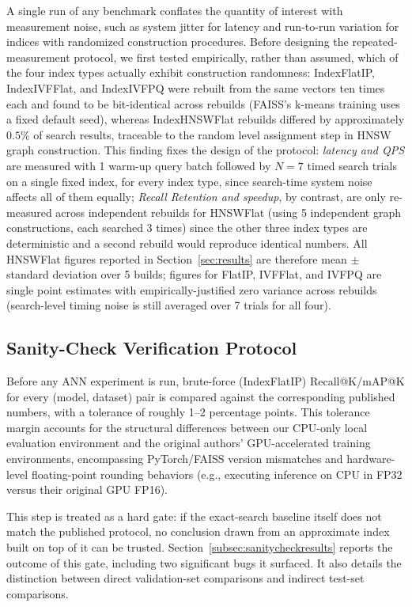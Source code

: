 \documentclass[conference]{IEEEtran}
\begin{document}
A single run of any benchmark conflates the quantity of interest with measurement noise, such as system jitter for latency and run-to-run variation for indices with randomized construction procedures. Before designing the repeated-measurement protocol, we first tested empirically, rather than assumed, which of the four index types actually exhibit construction randomness: IndexFlatIP, IndexIVFFlat, and IndexIVFPQ were rebuilt from the same vectors ten times each and found to be bit-identical across rebuilds (FAISS's k-means training uses a fixed default seed), whereas IndexHNSWFlat rebuilds differed by approximately $0.5\%$ of search results, traceable to the random level assignment step in HNSW graph construction. This finding fixes the design of the protocol: \emph{latency and QPS} are measured with 1 warm-up query batch followed by $N=7$ timed search trials on a single fixed index, for every index type, since search-time system noise affects all of them equally; \emph{Recall Retention and speedup}, by contrast, are only re-measured across independent rebuilds for HNSWFlat (using 5 independent graph constructions, each searched 3 times) since the other three index types are deterministic and a second rebuild would reproduce identical numbers. All HNSWFlat figures reported in Section~\ref{sec:results} are therefore mean $\pm$ standard deviation over 5 builds; figures for FlatIP, IVFFlat, and IVFPQ are single point estimates with empirically-justified zero variance across rebuilds (search-level timing noise is still averaged over 7 trials for all four).

\subsection{Sanity-Check Verification Protocol}
\label{subsec:sanitycheck}

Before any ANN experiment is run, brute-force (IndexFlatIP) Recall@K/mAP@K for every (model, dataset) pair is compared against the corresponding published numbers, with a tolerance of roughly 1--2 percentage points. This tolerance margin accounts for the structural differences between our CPU-only local evaluation environment and the original authors' GPU-accelerated training environments, encompassing PyTorch/FAISS version mismatches and hardware-level floating-point rounding behaviors (e.g., executing inference on CPU in FP32 versus their original GPU FP16).

This step is treated as a hard gate: if the exact-search baseline itself does not match the published protocol, no conclusion drawn from an approximate index built on top of it can be trusted. Section~\ref{subsec:sanitycheckresults} reports the outcome of this gate, including two significant bugs it surfaced. It also details the distinction between direct validation-set comparisons and indirect test-set comparisons.
\end{document}
